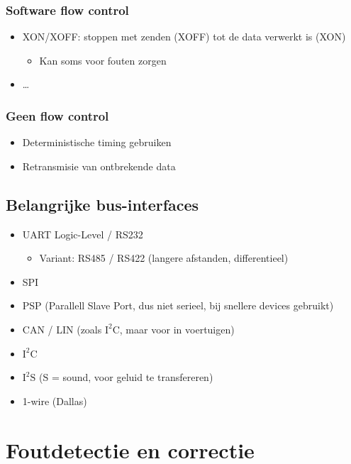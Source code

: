 \documentclass{article}
\begin{document}
\subsubsection{Software flow control}
\begin{itemize}
    \item XON/XOFF: stoppen met zenden (XOFF) tot de data verwerkt is (XON)
    \begin{itemize}
        \item Kan soms voor fouten zorgen
    \end{itemize}
    \item \dots
\end{itemize}

\subsubsection{Geen flow control}
\begin{itemize}
    \item Deterministische timing gebruiken
    \item Retransmisie van ontbrekende data
\end{itemize}

\subsection{Belangrijke bus-interfaces}
\begin{itemize}
    \item UART Logic-Level / RS232
    \begin{itemize}
        \item Variant: RS485 / RS422 (langere afstanden, differentieel)
    \end{itemize} 
    \item SPI
    \item PSP (Parallell Slave Port, dus niet serieel, bij snellere devices gebruikt)
    \item CAN / LIN (zoals $\text{I}^2\text{C}$, maar voor in voertuigen)
    \item $\text{I}^2\text{C}$
    \item $\text{I}^2\text{S}$ (S = sound, voor geluid te transfereren)
    \item 1-wire (Dallas)
\end{itemize}

\section{Foutdetectie en correctie}
\end{document}
